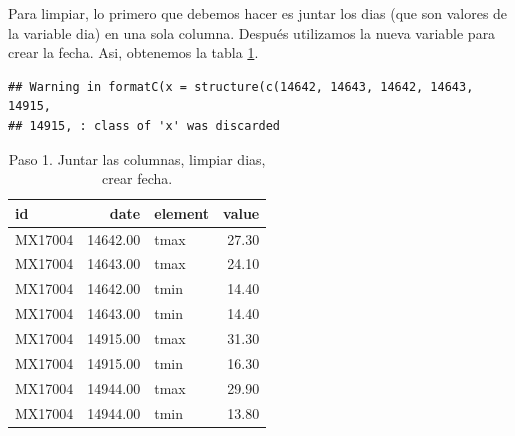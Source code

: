 \documentclass[]{article}
\newenvironment{Shaded}{\begin{snugshade}}{\end{snugshade}}
\newcommand{\KeywordTok}[1]{\textcolor[rgb]{0.13,0.29,0.53}{\textbf{{#1}}}}
\newcommand{\DataTypeTok}[1]{\textcolor[rgb]{0.13,0.29,0.53}{{#1}}}
\newcommand{\StringTok}[1]{\textcolor[rgb]{0.31,0.60,0.02}{{#1}}}
\newcommand{\CommentTok}[1]{\textcolor[rgb]{0.56,0.35,0.01}{\textit{{#1}}}}
\newcommand{\NormalTok}[1]{{#1}}
\begin{document}
Para limpiar, lo primero que debemos hacer es juntar los dias (que son
valores de la variable dia) en una sola columna. Después utilizamos la
nueva variable para crear la fecha. Asi, obtenemos la tabla
\ref{tab:clima1}.

\begin{Shaded}
\end{Shaded}

\begin{verbatim}
## Warning in formatC(x = structure(c(14642, 14643, 14642, 14643, 14915,
## 14915, : class of 'x' was discarded
\end{verbatim}

\begin{table}[ht]
\centering
\begin{tabular}{lrlr}
  \hline
id & date & element & value \\ 
  \hline
MX17004 & 14642.00 & tmax & 27.30 \\ 
  MX17004 & 14643.00 & tmax & 24.10 \\ 
  MX17004 & 14642.00 & tmin & 14.40 \\ 
  MX17004 & 14643.00 & tmin & 14.40 \\ 
  MX17004 & 14915.00 & tmax & 31.30 \\ 
  MX17004 & 14915.00 & tmin & 16.30 \\ 
  MX17004 & 14944.00 & tmax & 29.90 \\ 
  MX17004 & 14944.00 & tmin & 13.80 \\ 
   \hline
\end{tabular}
\caption{Paso 1. Juntar las columnas, limpiar dias, crear fecha.} 
\label{tab:clima1}
\end{table}
\end{document}
